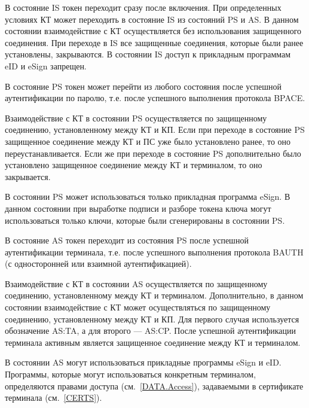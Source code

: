 В состояние IS токен переходит сразу после включения.
При определенных условиях КТ может переходить в состояние
IS из состояний PS и AS.
В данном состоянии взаимодействие с КТ осуществляется без использования 
защищенного соединения. При переходе в IS все защищенные соединения, 
которые были ранее установлены, закрываются.
В состоянии IS доступ к прикладным программам eID и eSign запрещен.

В состояние PS токен может перейти из любого состояния 
после успешной аутентификации по паролю, 
т.е. после успешного выполнения протокола BPACE. 
%

Взаимодействие с КТ в состоянии PS осуществляется по 
защищенному соединению, установленному между КТ и КП. 
Если при переходе в состояние PS защищенное соединение между КТ и ПС уже было 
установлено ранее, то оно переустанавливается. 
Если же при переходе в состояние PS дополнительно было установлено 
защищенное соединение между КТ и терминалом, то оно закрывается.

В состоянии PS может использоваться только прикладная программа eSign.
В данном состоянии при выработке подписи и разборе токена ключа
могут использоваться только ключи, которые были 
сгенерированы в состоянии PS.

В состояние AS токен переходит из состояния PS 
после успешной аутентификации терминала, т.е. 
после успешного выполнения протокола BAUTH 
(с односторонней или взаимной аутентификацией). 

Взаимодействие с КТ в состоянии AS осуществляется по 
защищенному соединению, установленному между КТ и терминалом.
Дополнительно, в данном состоянии 
взаимодействие с КТ может осуществляться 
по защищенному соединению, установленному между КТ и КП.
Для первого случая используется обозначение AS:TA, 
а для второго --- AS:CP. 
После успешной аутентификации терминала
активным является защищенное соединение между КТ и терминалом.


В состоянии AS могут использоваться прикладные программы eSign и eID. 
Программы, которые могут использоваться конкретным терминалом,
определяются правами доступа (см.~\ref{DATA.Access}),
задаваемыми в сертификате терминала (см.~\ref{CERTS}).
